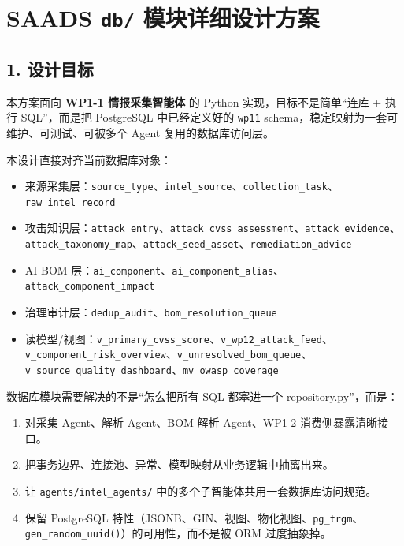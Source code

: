 \documentclass[UTF8]{ctexart}
\author{}
\date{}
\providecommand{\tightlist}{%
  \setlength{\itemsep}{0pt}\setlength{\parskip}{0pt}}
\begin{document}
\hypertarget{saads-db-ux6a21ux5757ux8be6ux7ec6ux8bbeux8ba1ux65b9ux6848}{%
\section{\texorpdfstring{SAADS \texttt{db/}
模块详细设计方案}{SAADS db/ 模块详细设计方案}}\label{saads-db-ux6a21ux5757ux8be6ux7ec6ux8bbeux8ba1ux65b9ux6848}}

\hypertarget{ux8bbeux8ba1ux76eeux6807}{%
\subsection{1. 设计目标}\label{ux8bbeux8ba1ux76eeux6807}}

本方案面向 \textbf{WP1-1 情报采集智能体} 的 Python
实现，目标不是简单``连库 + 执行 SQL''，而是把 PostgreSQL 中已经定义好的
\texttt{wp11} schema，稳定映射为一套可维护、可测试、可被多个 Agent
复用的数据库访问层。

本设计直接对齐当前数据库对象：

\begin{itemize}
\tightlist
\item
  来源采集层：\texttt{source\_type}、\texttt{intel\_source}、\texttt{collection\_task}、\texttt{raw\_intel\_record}
\item
  攻击知识层：\texttt{attack\_entry}、\texttt{attack\_cvss\_assessment}、\texttt{attack\_evidence}、\texttt{attack\_taxonomy\_map}、\texttt{attack\_seed\_asset}、\texttt{remediation\_advice}
\item
  AI BOM
  层：\texttt{ai\_component}、\texttt{ai\_component\_alias}、\texttt{attack\_component\_impact}
\item
  治理审计层：\texttt{dedup\_audit}、\texttt{bom\_resolution\_queue}
\item
  读模型/视图：\texttt{v\_primary\_cvss\_score}、\texttt{v\_wp12\_attack\_feed}、\texttt{v\_component\_risk\_overview}、\texttt{v\_unresolved\_bom\_queue}、\texttt{v\_source\_quality\_dashboard}、\texttt{mv\_owasp\_coverage}
\end{itemize}

数据库模块需要解决的不是``怎么把所有 SQL 都塞进一个
repository.py''，而是：

\begin{enumerate}
\def\labelenumi{\arabic{enumi}.}
\tightlist
\item
  对采集 Agent、解析 Agent、BOM 解析 Agent、WP1-2 消费侧暴露清晰接口。
\item
  把事务边界、连接池、异常、模型映射从业务逻辑中抽离出来。
\item
  让 \texttt{agents/intel\_agents/}
  中的多个子智能体共用一套数据库访问规范。
\item
  保留 PostgreSQL
  特性（JSONB、GIN、视图、物化视图、\texttt{pg\_trgm}、\texttt{gen\_random\_uuid()}）的可用性，而不是被
  ORM 过度抽象掉。
\end{enumerate}
\end{document}
